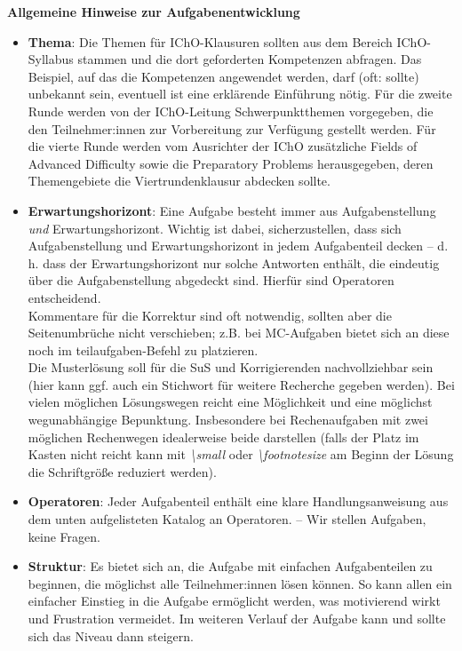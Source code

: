 \documentclass[./main.tex]{subfiles}
\begin{document}
\newpage
{\centering\textbf{Allgemeine Hinweise zur Aufgabenentwicklung}}
\begin{itemize}
    \item \textbf{Thema}: Die Themen f\"ur IChO-Klausuren sollten aus dem Bereich IChO-Syllabus stammen und die dort geforderten Kompetenzen abfragen. Das Beispiel, auf das die Kompetenzen angewendet werden, darf (oft: sollte) unbekannt sein, eventuell ist eine erkl\"arende Einf\"uhrung n\"otig. F\"ur die zweite Runde werden von der IChO-Leitung Schwerpunktthemen vorgegeben, die den Teilnehmer:innen zur Vorbereitung zur Verf\"ugung gestellt werden. F\"ur die vierte Runde werden vom Ausrichter der IChO zus\"atzliche \glqq{}Fields of Advanced Difficulty\grqq{} sowie die \glqq{}Preparatory Problems\grqq{} herausgegeben, deren Themengebiete die Viertrundenklausur abdecken sollte. 
    \item \textbf{Erwartungshorizont}: Eine Aufgabe besteht immer aus Aufgabenstellung \textit{und} Erwartungshorizont. Wichtig ist dabei, sicherzustellen, dass sich Aufgabenstellung und Erwartungshorizont in jedem Aufgabenteil decken -- d. h. dass der Erwartungshorizont nur solche Antworten enth\"alt, die eindeutig \"uber die Aufgabenstellung abgedeckt sind. Hierf\"ur sind Operatoren entscheidend. \\
    Kommentare f\"ur die Korrektur sind oft notwendig, sollten aber die Seitenumbr\"uche nicht verschieben; z.B. bei MC-Aufgaben bietet sich an diese noch im teilaufgaben-Befehl zu platzieren. \\
    Die Musterl\"osung soll f\"ur die SuS und Korrigierenden nachvollziehbar sein (hier kann ggf. auch ein Stichwort f\"ur weitere Recherche gegeben werden). Bei vielen m\"oglichen L\"osungswegen reicht eine M\"oglichkeit und eine m\"oglichst wegunabh\"angige Bepunktung. Insbesondere bei Rechenaufgaben mit zwei m\"oglichen Rechenwegen idealerweise beide darstellen (falls der Platz im Kasten nicht reicht kann mit \textit{\textbackslash small} oder \textit{\textbackslash footnotesize} am Beginn der L\"osung die Schriftgr\"o\ss{}e reduziert werden).
    \item \textbf{Operatoren}: Jeder Aufgabenteil enth\"alt eine klare Handlungsanweisung aus dem unten aufgelisteten Katalog an Operatoren. -- \glqq{}Wir stellen Aufgaben, keine Fragen.\grqq{}
    \item \textbf{Struktur}: Es bietet sich an, die Aufgabe mit einfachen Aufgabenteilen zu beginnen, die m\"oglichst alle Teilnehmer:innen l\"osen k\"onnen. So kann allen ein einfacher Einstieg in die Aufgabe erm\"oglicht werden, was motivierend wirkt und Frustration vermeidet. Im weiteren Verlauf der Aufgabe kann und sollte sich das Niveau dann steigern. 

\end{itemize}
\end{document}
